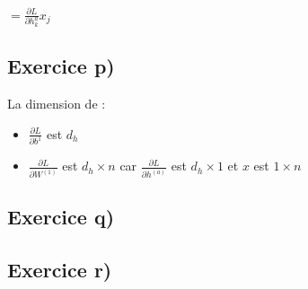 \documentclass[a4paper,10pt]{article}
\begin{document}
$ = \frac{\partial L}{\partial h^{a}_{k}} x_{j} $


\subsection{Exercice p)}

La dimension de :
\begin{itemize}
	\item $\frac{\partial L}{\partial b^{1}}$ est $d_{h}$
	\item $\frac{\partial L}{\partial W^{(1)}}$ est $d_{h} \times n$ car  $\frac{\partial L}{\partial h^{(a)}}$ est $d_{h} \times 1$ et $ x $ est $1 \times n$
\end{itemize}


\subsection{Exercice q)}

\subsection{Exercice r)}
\end{document}
